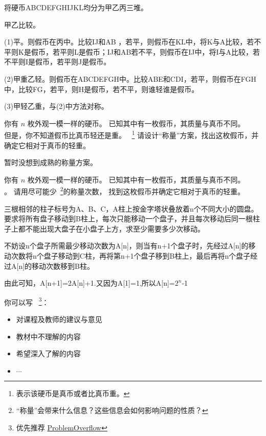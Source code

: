 \documentclass[a4paper, justified]{tufte-handout}
\begin{document}
\begin{solution}%

  将硬币ABCDEFGHIJKL均分为甲乙丙三堆。

  甲乙比较。

  (1)平。则假币在丙中。比较IJ和AB ，若平，则假币在KL中，将K与A比较，若不平则K是假币，若平则L是假币；IJ和AB若不平，则假币在IJ中，将I与A比较，若不平则I是假币，若平则J是假币。

  (2)甲重乙轻。则假币在ABCDEFGH中。比较ABE和CDI，若平，则假币在FGH中，比较FG，若平，则H是假币，若不平，则谁轻谁是假币。

  (3)甲轻乙重，与(2)中方法对称。

\end{solution}

\beginoptional
\begin{problem}[$n$ 枚硬币]
你有 $n$ 枚外观一模一样的硬币。
已知其中有一枚假币，其质量与真币不同。\\
但是，你不知道假币比真币轻还是重。
~\footnote{表示该硬币是真币或者比真币重。} 
请设计``称量''方案，找出这枚假币，并确定它相对于真币的轻重。
\end{problem}

\begin{solution}

  暂时没想到成熟的称量方案。
\end{solution}

\beginot
\begin{ot}[$n$ 枚硬币]
  你有 $n$ 枚外观一模一样的硬币。
  已知其中有一枚假币，其质量与真币不同。\\
  。
  请用尽可能少~\footnote{``称量''会带来什么信息？这些信息会如何影响问题的性质？}的称量次数，
  找到这枚假币并确定它相对于真币的轻重。
\end{ot}

\begin{ot}[汉诺塔问题]
  三根相邻的柱子标号为A、B、C，A柱上按金字塔状叠放着n个不同大小的圆盘。要求将所有盘子移动到B柱上，每次只能移动一个盘子，并且每次移动后同一根柱子上都不能出现大盘子在小盘子上方，求至少需要多少次移动。
\end{ot}

\begin{solution}

  不妨设n个盘子所需最少移动次数为A[n]，则当有n+1个盘子时，先经过A[n]的移动次数将n个盘子移动到C柱，再将第n+1个盘子移到B柱上，最后再将n个盘子经过A[n]的移动次数移到B柱。

  由此可知，A[n+1]=2A[n]+1.又因为A[1]=1,所以A[n]=$2^n$-1

\end{solution}
\beginfb

你可以写
~\footnote{优先推荐 \href{http://39.100.120.199}{ProblemOverflow}}：
\begin{itemize}
  \item 对课程及教师的建议与意见
  \item 教材中不理解的内容
  \item 希望深入了解的内容
  \item $\cdots$
\end{itemize}
\end{document}
